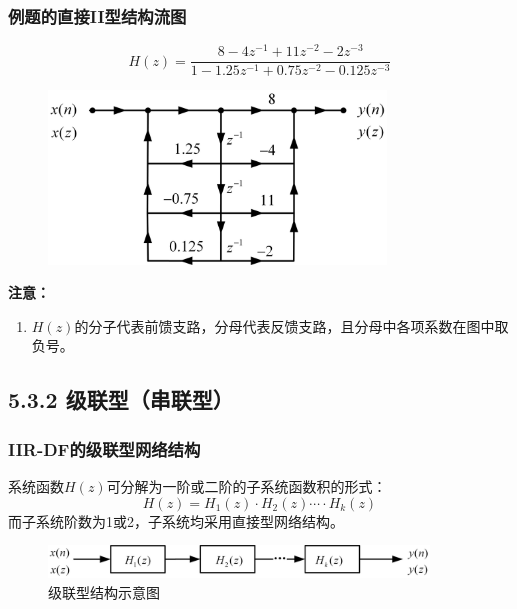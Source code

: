 \documentclass[notheorems,compress,mathserif,table]{beamer}
\begin{document}
\begin{frame}[shrink]\frametitle{例题的直接II型结构流图}%
$$H(z)=\frac{8-4z^{-1}+11z^{-2}-2z^{-3}}{1-1.25z^{-1}+0.75z^{-2}-0.125z^{-3}}$$
\begin{figure}[h]
\centering
\includegraphics[width=0.80\textwidth]{zhijieerxingli.jpg}
\end{figure}
\textbf{注意：}
\begin{enumerate}
  \item  $H(z)$的分子代表前馈支路，分母代表反馈支路，且分母中各项系数在图中取负号。
 \end{enumerate}
\end{frame}
\subsection{5.3.2 级联型（串联型）}
\begin{frame}\frametitle{IIR-DF的级联型网络结构}%
%
系统函数$H(z)$可分解为一阶或二阶的子系统函数积的形式：
$$H(z)=H_1(z)\cdot H_2(z)\cdots \cdot H_k(z)$$
而子系统阶数为1或2，子系统均采用直接型网络结构。
\begin{figure}[h]
\centering
\includegraphics[width=0.9\textwidth]{jilianxing.jpg}
\caption{级联型结构示意图}
\end{figure}
\end{frame}
\end{document}
